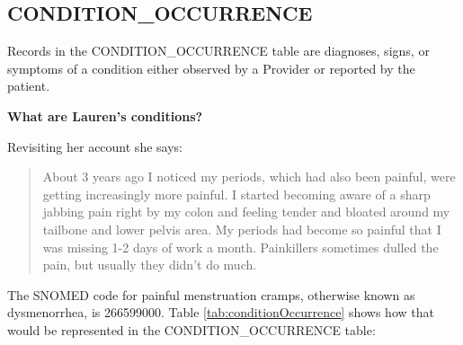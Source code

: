 \documentclass[11pt]{book}
\begin{document}
\subsection{CONDITION\_OCCURRENCE}\label{conditionOccurrence}

Records in the CONDITION\_OCCURRENCE table are diagnoses, signs, or
symptoms of a condition either observed by a Provider or reported by the
patient.

\textbf{What are Lauren's conditions?}

Revisiting her account she says:

\begin{quote}
About 3 years ago I noticed my periods, which had also been painful,
were getting increasingly more painful. I started becoming aware of a
sharp jabbing pain right by my colon and feeling tender and bloated
around my tailbone and lower pelvis area. My periods had become so
painful that I was missing 1-2 days of work a month. Painkillers
sometimes dulled the pain, but usually they didn't do much.
\end{quote}

The SNOMED code for painful menstruation cramps, otherwise known as
dysmenorrhea, is 266599000. Table \ref{tab:conditionOccurrence} shows
how that would be represented in the CONDITION\_OCCURRENCE table:
\end{document}
